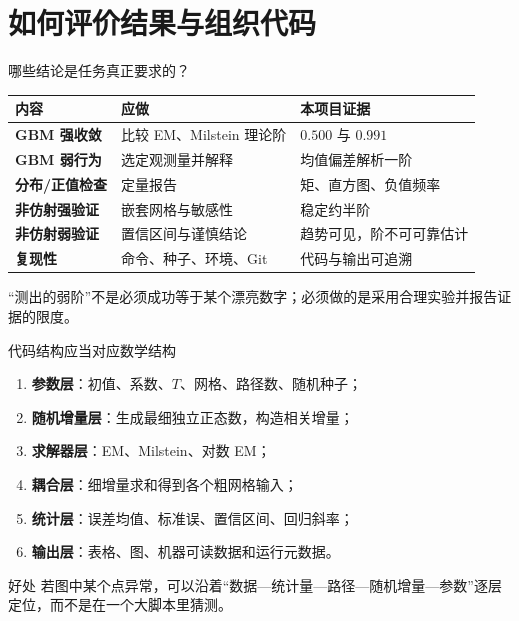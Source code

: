 \documentclass[aspectratio=169,10pt,fontset=none]{ctexbeamer}
\begin{document}
\section{如何评价结果与组织代码}

\begin{frame}{哪些结论是任务真正要求的？}
  \begin{tabularx}{\textwidth}{>{\bfseries}p{3.3cm}XX}
    \toprule
    内容 & 应做 & 本项目证据 \\
    \midrule
    GBM 强收敛 & 比较 EM、Milstein 理论阶 & $0.500$ 与 $0.991$ \\
    GBM 弱行为 & 选定观测量并解释 & 均值偏差解析一阶 \\
    分布/正值检查 & 定量报告 & 矩、直方图、负值频率 \\
    非仿射强验证 & 嵌套网格与敏感性 & 稳定约半阶 \\
    非仿射弱验证 & 置信区间与谨慎结论 & 趋势可见，阶不可可靠估计 \\
    复现性 & 命令、种子、环境、Git & 代码与输出可追溯 \\
    \bottomrule
  \end{tabularx}
  \vspace{0.6em}
  ``测出的弱阶''不是必须成功等于某个漂亮数字；必须做的是采用合理实验并报告证据的限度。
\end{frame}

\begin{frame}{代码结构应当对应数学结构}
  \begin{enumerate}
    \item \textbf{参数层}：初值、系数、$T$、网格、路径数、随机种子；
    \item \textbf{随机增量层}：生成最细独立正态数，构造相关增量；
    \item \textbf{求解器层}：EM、Milstein、对数 EM；
    \item \textbf{耦合层}：细增量求和得到各个粗网格输入；
    \item \textbf{统计层}：误差均值、标准误、置信区间、回归斜率；
    \item \textbf{输出层}：表格、图、机器可读数据和运行元数据。
  \end{enumerate}
  \begin{block}{好处}
    若图中某个点异常，可以沿着“数据—统计量—路径—随机增量—参数”逐层定位，而不是在一个大脚本里猜测。
  \end{block}
\end{frame}
\end{document}
